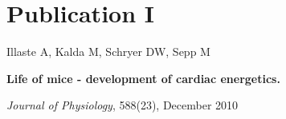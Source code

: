 \chapter*{Publication I}
\addtocounter{chapter}{-1}
\label{pubIpage}
\vfill
\setlength{\parindent}{0cm}

Illaste A, Kalda M, Schryer DW, Sepp M 

{\bf Life of mice - development of
  cardiac energetics.} 

\emph{Journal of Physiology}, 588(23), December 2010
\vfill
\pagebreak
\vspace*{3cm}\thispagestyle{empty}
\pagebreak

\renewcommand{\thepaper}{\PaperI}

%
%
